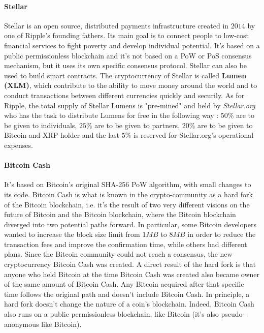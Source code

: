 \paragraph{Stellar}
Stellar is an open source, distributed payments infrastructure created in $2014$ by one of Ripple's founding fathers. Its main goal is to connect people to low-cost financial services to fight poverty and develop individual potential. It's based on a public permissionless blockchain and it's not based on a PoW or PoS consensus mechanism, but it uses its own specific consensus protocol. Stellar can also be used to build smart contracts. The cryptocurrency of Stellar is called \textbf{Lumen (XLM)}, which contribute to the ability to move money around the world and to conduct transactions between different currencies quickly and securily. As for Ripple, the total supply of Stellar Lumens is "pre-mined" and held by \textit{Stellar.org} who has the task to distribute Lumens for free in the following way : $50 \%$ are to be given to individuals, $25 \%$ are to be given to partners, $20 \%$ are to be given to Bitcoin and XRP holder and the last $5 \%$ is reserved for Stellar.org's operational expenses.

\paragraph{Bitcoin Cash} It's based on Bitcoin's original SHA-256 PoW algorithm, with small changes to its code. Bitcoin Cash is what is known in the crypto-community as a hard fork of the Bitcoin blockchain, i.e. it's the result of two very different visions on the future of Bitcoin and the Bitcoin blockchain, where the Bitcoin blockchain diverged into two potential paths forward. In particular, some Bitcoin developers wanted to increase the block size limit from $1MB$ to $8MB$ in order to reduce the transaction fees and improve the confirmation time, while others had different plans. Since the Bitcoin community could not reach a consensus, the new cryptocurrency Bitcoin Cash was created. A direct result of the hard fork is that anyone who held Bitcoin at the time Bitcoin Cash was created also became owner of the same amount of Bitcoin Cash. Any Bitcoin acquired after that specific time follows the original path and doesn't include Bitcoin Cash. In principle, a hard fork doesn't change the nature of a coin's blockchain. Indeed, Bitcoin Cash also runs on a public permissionless blockchain, like Bitcoin (it's also pseudo-anonymous like Bitcoin).

